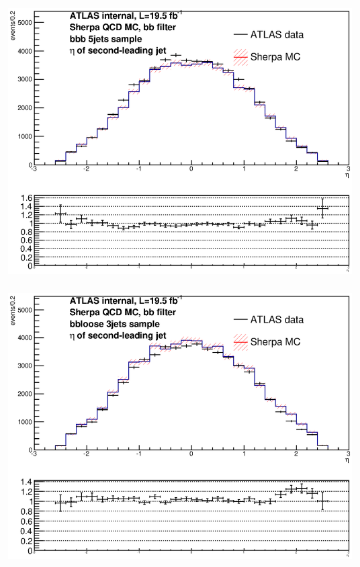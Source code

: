 \begin{figure}[phtb!]
\begin{center}
  \begin{subfigure}[$bbb$ 5+ jet category]{0.3\textwidth}\includegraphics[width=\textwidth]{MonteCarlo/figures/eta1_bbb_5jets.eps}\end{subfigure}
  \begin{subfigure}[$bbloose$ 3 jet category]{0.3\textwidth}\includegraphics[width=\textwidth]{MonteCarlo/figures/eta1_bbloose_3jets.eps}\end{subfigure}

\end{center}
\end{figure}
